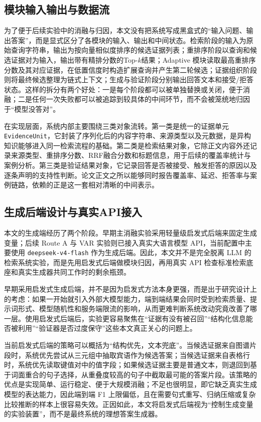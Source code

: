 \subsection{模块输入输出与数据流}

为了便于后续实验中的消融与归因，本文没有把系统写成黑盒式的“输入问题、输出答案”，而是显式区分了各模块的输入、输出和中间状态。检索阶段的输入为原始查询字符串，输出为按向量相似度排序的候选证据列表；重排序阶段以查询和候选证据对为输入，输出带有精排分数的Top-$k$结果；Adaptive 模块读取最高重排序分数及其对应证据，在低置信度时构造扩展查询并产生第二轮候选；证据组织阶段则将最终候选整理为链式上下文；生成与验证阶段分别输出回答文本和接受/拒答状态。这样的拆分有两个好处：一是每个阶段都可以被单独替换或关闭，便于消融；二是任何一次失败都可以被追踪到较具体的中间环节，而不会被笼统地归因于“模型没答对”。

在实现层面，系统内部主要围绕三类对象流转。第一类是统一的证据单元 \texttt{EvidenceUnit}，它封装了序列化后的内容字符串、来源类型以及元数据，是异构知识能够进入同一检索流程的基础。第二类是检索结果对象，它除正文内容外还记录来源类型、重排序分数、RRF融合分数和标题信息，用于后续的覆盖率统计与案例分析。第三类是验证结果对象，它记录回答是否被接受、触发拒答的原因以及逐条声明的支持性判断。论文正文之所以能够同时报告覆盖率、延迟、拒答率与案例链路，依赖的正是这一套相对清晰的中间表示。

\subsection{生成后端设计与真实API接入}

本文的生成端经历了两个阶段。早期主消融实验采用轻量级启发式后端来固定生成变量；后续 Route A 与 VAR 实验则已接入真实大语言模型 API，当前配置中主要使用 \texttt{deepseek-v4-flash} 作为生成后端。因此，本文并不是完全脱离 LLM 的检索系统实验，而是先用启发式后端做模块归因，再用真实 API 检查标准检索底座和真实生成器共同工作时的剩余瓶颈。

早期采用启发式生成后端，并不是因为启发式方法本身更强，而是出于研究设计上的考虑：如果一开始就引入外部大模型能力，端到端结果会同时受到检索质量、提示词形式、模型随机性和服务端限流的影响，从而更难判断系统改动究竟改善了哪一层。使用启发式后端后，实验更容易聚焦在“证据有没有被召回”“结构化信息能否被利用”“验证器是否过度保守”这些本文真正关心的问题上。

当前启发式后端的策略可以概括为“结构优先，文本兜底”。当候选证据来自图谱片段时，系统优先尝试从三元组中抽取宾语作为候选答案；当候选证据来自表格行时，系统优先读取键值对中的值字段；如果候选证据主要是普通文本，则退回到基于词面重合的句子选择，从重叠度较高的句子中截取最可能的答案片段。该策略的优点是实现简单、运行稳定、便于大规模消融；不足也很明显，即它缺乏真实生成模型的表达能力，因此端到端 F1 上限偏低，且在需要句式重写、归纳压缩或复杂比较推断的样本上很容易失效。正因如此，本文将启发式后端视为“控制生成变量的实验装置”，而不是最终系统的理想答案生成器。

